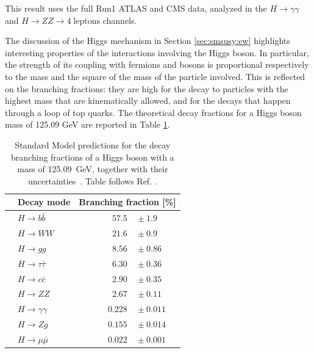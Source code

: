 \noindent This result uses the full Run1 ATLAS and CMS data, analyzed in the $H \rightarrow \gamma \gamma$ and $H \rightarrow ZZ \rightarrow 4 \; \mathrm{leptons}$ channels.


The discussion of the Higgs mechanism in Section \ref{sec:smsusy:ew} highlights interesting properties of the interactions involving the Higgs boson. In particular, the strength of its coupling with fermions and bosons is proportional respectively to the mass and the square of the mass of the particle involved. This is reflected on the branching fractions: they are high for the decay to particles with the highest mass that are kinematically allowed, and for the decays that happen through a loop of top quarks. The theoretical decay fractions for a Higgs boson mass of 125.09 GeV are reported in Table \ref{tab:SMBranchingFractions}. 

\begin{table}[htbp]
\begin{center}
\begin{tabular}{clcr@{\hskip 0.4ex}l} \\ 
\hline
 &    Decay mode &\multicolumn{3}{c}{Branching fraction [\%]}  \\  \hline
 \hline
 &     $H \rightarrow b\bar{b}$       & &   $57.5$&${}\pm 1.9$    \\
 &     $H \rightarrow WW$       & &   $21.6$&${}\pm 0.9$   \\
 &     $H \rightarrow gg$       & &   $8.56$&${}\pm 0.86$  \\
 &     $H \rightarrow \tau \bar{\tau}$       & &   $6.30$&${}\pm 0.36$  \\
 &     $H \rightarrow c\bar{c}$       & &   $2.90$&${}\pm 0.35$  \\
 &     $H \rightarrow ZZ$       & &   $2.67$&${}\pm 0.11$  \\
 &     $H \rightarrow \gamma \gamma$       & &   $0.228$&${}\pm 0.011$  \\
 &     $H \rightarrow Zg$       & &   $0.155$&${}\pm 0.014$  \\
 &     $H \rightarrow \mu \bar{\mu}$       & &   ~~$0.022$&${}\pm 0.001$  \\ 
\hline
\end{tabular} 
\end{center}
\caption{Standard Model predictions for the decay branching fractions of a Higgs boson with a mass of 125.09~GeV, together with their uncertainties~\cite{Heinemeyer:2013tqa}. Table follows Ref. \cite{Khachatryan:2016vau}.}
\label{tab:SMBranchingFractions}
\end{table} 

